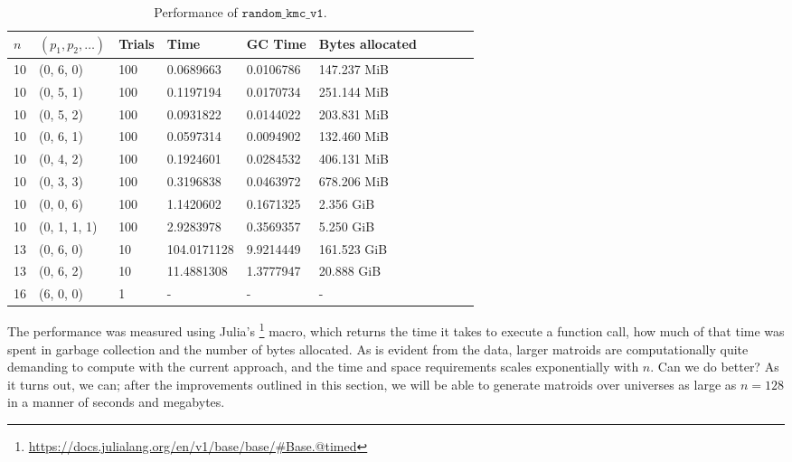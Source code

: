\begin{table*}[ht!]
  \centering
  \caption{Performance of $\texttt{random\_kmc\_v1}$.}
  \label{tab:perf_v1}
  \begin{threeparttable}
    \begin{tabular}{llllllllll}
      \toprule
      $n$ & $(p_1, p_2, \ldots)$ & Trials & Time  & GC Time & Bytes allocated \\
      \midrule
        10 & (0, 6, 0)    & 100 & 0.0689663   & 0.0106786 & 147.237 MiB \\
        10 & (0, 5, 1)    & 100 & 0.1197194   & 0.0170734 & 251.144 MiB \\
        10 & (0, 5, 2)    & 100 & 0.0931822   & 0.0144022 & 203.831 MiB \\
        10 & (0, 6, 1)    & 100 & 0.0597314   & 0.0094902 & 132.460 MiB \\
        10 & (0, 4, 2)    & 100 & 0.1924601   & 0.0284532 & 406.131 MiB \\
        10 & (0, 3, 3)    & 100 & 0.3196838   & 0.0463972 & 678.206 MiB \\
        10 & (0, 0, 6)    & 100 & 1.1420602   & 0.1671325 & 2.356 GiB   \\
        10 & (0, 1, 1, 1) & 100 & 2.9283978   & 0.3569357 & 5.250 GiB   \\
        13 & (0, 6, 0)    & 10  & 104.0171128 & 9.9214449 & 161.523 GiB \\
        13 & (0, 6, 2)    & 10  & 11.4881308  & 1.3777947 & 20.888 GiB  \\
        16 & (6, 0, 0)    & 1   & -           & -         & -           \\
      \bottomrule
    \end{tabular}
  \end{threeparttable}
\end{table*}

The performance was measured using Julia's \footnote{\href{https://docs.julialang.org/en/v1/base/base/\#Base.@timed}{https://docs.julialang.org/en/v1/base/base/\#Base.@timed}} macro, which returns the time it takes to execute a function call, how much of that time was spent in garbage collection and the number of bytes allocated. As is evident from the data, larger matroids are computationally quite demanding to compute with the current approach, and the time and space requirements scales exponentially with $n$. Can we do better? As it turns out, we can; after the improvements outlined in this section, we will be able to generate matroids over universes as large as $n=128$ in a manner of seconds and megabytes.

